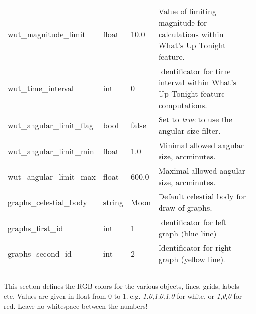 \begin{longtable}{l|l|l|p{65mm}}
wut\_magnitude\_limit          & float  & 10.0  & Value of limiting magnitude for calculations within What's Up Tonight feature.\\%
wut\_time\_interval            & int    & 0     & Identificator for time interval within What's Up Tonight feature computations.\\%
wut\_angular\_limit\_flag      & bool   & false & Set to \emph{true} to use the angular size filter.\\%
wut\_angular\_limit\_min       & float  & 1.0   & Minimal allowed angular size, arcminutes.\\%
wut\_angular\_limit\_max       & float  & 600.0 & Maximal allowed angular size, arcminutes.\\%
graphs\_celestial\_body        & string & Moon  & Default celestial body for draw of graphs.\\%
graphs\_first\_id              & int    & 1     & Identificator for left graph (blue line).\\%
graphs\_second\_id             & int    & 2     & Identificator for right graph (yellow line).\\\bottomrule
\end{longtable}

\subsection{}

This section defines the RGB colors for the various objects, lines,
grids, labels etc. Values are given in float from 0 to
1. e.g. \emph{1.0,1.0,1.0} for white, or \emph{1,0,0} for red. Leave
no whitespace between the numbers!

